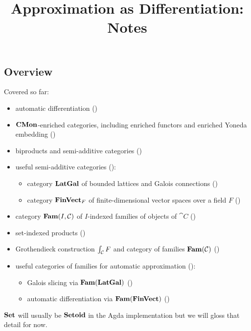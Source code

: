 \documentclass[acmsmall,screen]{acmart}
\begin{document}
\title{Approximation as Differentiation: Notes}

\maketitle

\subsection{Overview}

Covered so far:
\begin{itemize}
\item automatic differentiation ()
\item $\mathbf{CMon}$-enriched categories, including enriched functors and enriched Yoneda embedding ()
\item biproducts and semi-additive categories ()
\item useful semi-additive categories ():
   \begin{itemize}
   \item category $\mathbf{LatGal}$ of bounded lattices and Galois connections ()
   \item category $\mathbf{FinVect}_F$ of finite-dimensional vector spaces over a field $F$
   ()
   \end{itemize}
\item category $\mathbf{Fam}(I,\mathcal{C})$ of $I$-indexed families of objects of $\cat{C}$ ()
\item set-indexed products ()
\item Grothendieck construction $\int_{\mathcal{C}}F$ and category of families $\mathbf{Fam}(\mathcal{C})$
()
\item useful categories of families for automatic approximation
():
   \begin{itemize}
      \item Galois slicing via $\mathbf{Fam}(\mathbf{LatGal})$ ()
      \item automatic differentiation via $\mathbf{Fam}(\mathbf{FinVect})$ ()
   \end{itemize}
\end{itemize}

\noindent $\mathbf{Set}$ will usually be $\mathbf{Setoid}$ in the Agda implementation but we will gloss that detail for now.
















\end{document}
